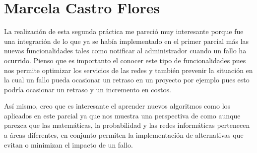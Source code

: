 \section{Marcela Castro Flores}
La realización de esta segunda práctica me pareció muy interesante porque fue una integración de lo que ya se había implementado en el primer parcial más las nuevas funcionalidades tales como notificar al administrador cuando un fallo ha ocurrido.
Pienso que es importanto el conocer este tipo de funcionalidades pues nos permite optimizar los servicios de las redes y también prevenir la situación en la cual un fallo pueda ocasionar un retraso en un proyecto por ejemplo pues esto podría ocasionar un retraso y un incremento en costos.
\\ \par
Así mismo, creo que es interesante el aprender nuevos algoritmos como los aplicados en este parcial ya que nos muestra una perspectiva de como aunque parezca que las matemáticas, la probabilidad y las redes informáticas pertenecen a áreas diferentes, en conjunto permiten la implementación de alternativas que evitan o minimizan el impacto de un fallo.